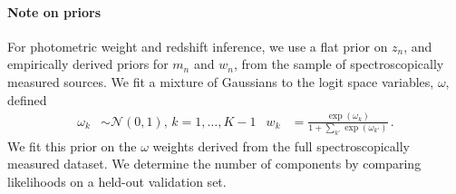 \documentclass{article} %
\begin{document}
\paragraph{Note on priors}
For photometric weight and redshift inference, we use a flat prior on $z_n$, and empirically derived priors for $m_n$ and $w_n$, from the sample of spectroscopically measured sources.  
We fit a mixture of Gaussians to the logit space variables, $\omega$, defined 
\begin{align}
  \omega_k &\sim \mathcal{N}(0, 1), \, k = 1, \dots, K-1 &
  w_k &= \frac{\exp(\omega_k)}{1 + \sum_{k'} \exp(\omega_{k'})} \, .
\end{align}
We fit this prior on the $\omega$ weights derived from the full spectroscopically measured dataset.  We determine the number of components by comparing likelihoods on a held-out validation set.  


%
\end{document}

